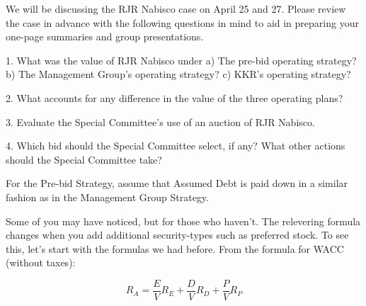 \documentclass[letterpaper,11pt]{texMemo} %
\begin{document}
\maketitle %

We will be discussing the RJR Nabisco case on April 25 and 27. Please review the case in advance with the following questions in mind to aid in preparing your one-page summaries and group presentations.

1. What was the value of RJR Nabisco under
     a) The pre-bid operating strategy?
     b) The Management Group’s operating strategy?
     c) KKR’s operating strategy?
     
     
     
     
     
     
2. What accounts for any difference in the value of the three operating plans?





3. Evaluate the Special Committee’s use of an auction of RJR Nabisco.




4. Which bid should the Special Committee select, if any? What other actions should the Special Committee take?




For the Pre-bid Strategy, assume that Assumed Debt is paid down in a similar fashion as in the Management Group Strategy. 

Some of you may have noticed, but for those who haven't. The relevering formula changes when you add additional security-types such as preferred stock. To see this, let's start with the formulas we had before. From the formula for WACC (without taxes):

$$R_A=\frac{E}{V}R_E+\frac{D}{V}R_D+\frac{P}{V}R_P$$


\end{document}
